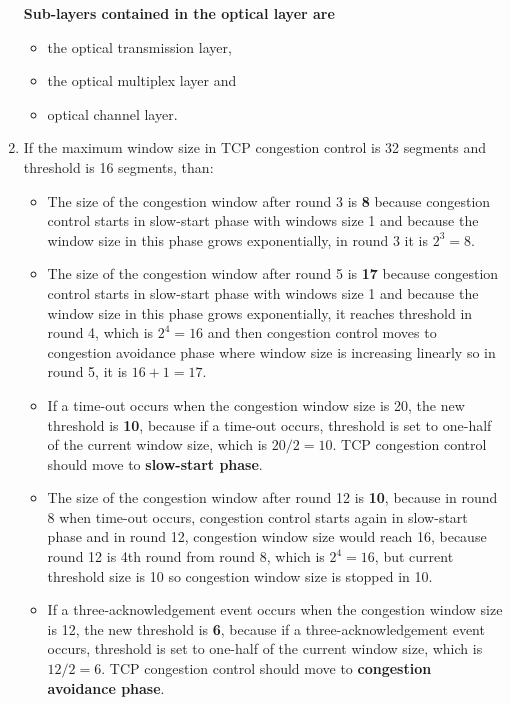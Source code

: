 \documentclass[a4paper, 11pt]{article}
\begin{document}
\begin{enumerate}
			\textbf{Sub-layers contained in the optical layer are}
			\begin{itemize}
				\item the optical transmission layer,
				\item the optical multiplex layer and
				\item optical channel layer.
			\end{itemize}

		\item %
			If the maximum window size in TCP congestion control is 32 segments and threshold is 16 segments, than:
			\begin{itemize}
				\item
					The size of the congestion window after round 3 is \textbf{8} because congestion control starts
					in slow-start phase with windows size 1 and because the window size in this phase grows
					exponentially, in round 3 it is $ 2^3 = 8 $.

				\item
					The size of the congestion window after round 5 is \textbf{17} because congestion control starts
					in slow-start phase with windows size 1 and because the window size in this phase grows
					exponentially, it reaches threshold in round 4, which is $ 2^4 = 16 $ and then congestion control
					moves to congestion avoidance phase where window size is increasing linearly so in round
					5, it is $ 16 + 1 = 17 $.

				\item
					If a time-out occurs when the congestion window size is 20, the new threshold is \textbf{10},
					because if a time-out occurs, threshold is set to one-half of the current window size,
					which is $ 20 / 2 = 10 $. TCP congestion control should move to \textbf{slow-start phase}.

				\item
					The size of the congestion window after round 12 is \textbf{10}, because in round 8 when time-out
					occurs, congestion control starts again in slow-start phase and in round 12, congestion window
					size would reach 16, because round 12 is 4th round from round 8, which is $ 2^4 = 16 $, but
					current threshold size is 10 so congestion window size is stopped in 10.

				\item
					If a three-acknowledgement event occurs when the congestion window size is 12, the new threshold
					is \textbf{6}, because if a three-acknowledgement event occurs, threshold is set to one-half of
					the current window size, which is $ 12/2 = 6 $. TCP congestion control should move to
					\textbf{congestion avoidance phase}.
			\end{itemize}
	\end{enumerate}
\end{document}
